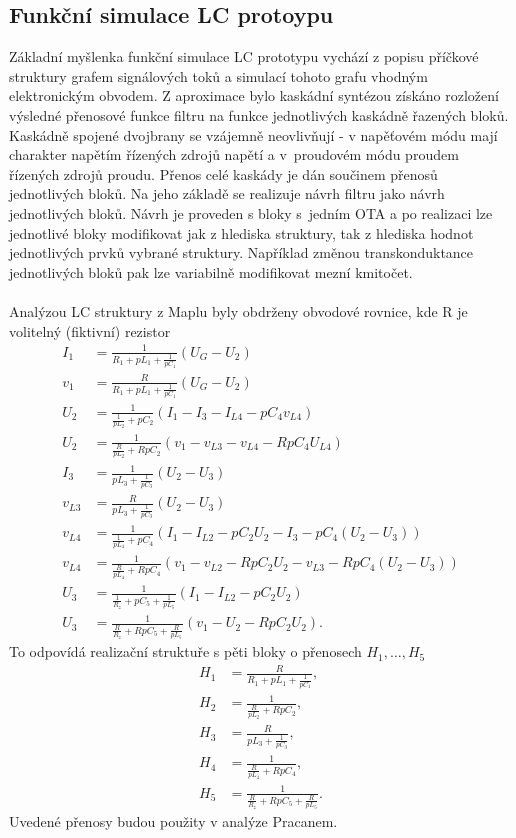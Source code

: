 \subsection{Funkční simulace LC protoypu}\label{s:KASK}
Základní myšlenka funkční simulace LC prototypu vychází z popisu příčkové struktury grafem signálových toků a simulací tohoto grafu vhodným elektronickým obvodem. Z aproximace bylo kaskádní syntézou získáno rozložení výsledné přenosové funkce filtru na funkce jednotlivých kaskádně řazených bloků. Kaskádně spojené dvojbrany se vzájemně neovlivňují - v napěťovém módu mají charakter napětím řízených zdrojů napětí a v~proudovém módu proudem řízených zdrojů proudu. Přenos celé kaskády je dán součinem přenosů jednotlivých bloků. Na jeho základě se realizuje návrh filtru jako návrh jednotlivých bloků. Návrh je proveden s bloky s~jedním OTA a po realizaci lze jednotlivé bloky modifikovat jak z hlediska struktury, tak z hlediska hodnot jednotlivých prvků vybrané struktury. Například změnou transkonduktance jednotlivých bloků pak lze variabilně modifikovat mezní kmitočet.\\
\\
\noindent Analýzou LC struktury z Maplu byly obdrženy obvodové rovnice, kde R je volitelný (fiktivní) rezistor
\begin{align}
I_1 &= \frac{1}{R_1 + pL_1 + \frac{1}{pC_1}}(U_G - U_2)\\
v_1 & = \frac{R}{R_1 + pL_1 + \frac{1}{pC_1}}(U_G - U_2)\\
U_2 &= \frac{1}{\frac{1}{pL_2} + pC_2}(I_1 - I_{3} - I_{L4} - pC_4 v_{L4})\\
U_2 &= \frac{1}{\frac{R}{pL_2} + RpC_2}(v_1 - v_{L3} - v_{L4} - RpC_4 U_{L4})\\
I_{3} &= \frac{1}{pL_3 + \frac{1}{pC_3}}(U_2 - U_3)\\
v_{L3} &= \frac{R}{pL_3 + \frac{1}{pC_3}}(U_2 - U_3)\\
v_{L4} &= \frac{1}{\frac{1}{pL_4}+pC_4}(I_1 - I_{L2} - pC_2U_2 - I_{3} - pC_4 (U_2 - U_3))\\
v_{L4} &= \frac{1}{\frac{R}{pL_4}+RpC_4}(v_1 - v_{L2} - RpC_2U_2 - v_{L3} - RpC_4 (U_2 - U_3))\\
U_3 &= \frac{1}{\frac{1}{R_z}+pC_5 + \frac{1}{pL_5}}(I_1 - I_{L2} - pC_2U_2)\\
U_3 &= \frac{1}{\frac{R}{R_z}+RpC_5 + \frac{R}{pL_5}}(v_1 - U_2 - RpC_2 U_2).
\end{align}
\noindent To odpovídá realizační struktuře s pěti bloky o přenosech $H_1, \ldots,H_5$
\begin{align}
H_1 & = \frac{R}{R_1 + pL_1 + \frac{1}{pC_1}},\\
H_2 &= \frac{1}{\frac{R}{pL_2} + RpC_2},\\
H_3 &= \frac{R}{pL_3 + \frac{1}{pC_3}},\\
H_4 &= \frac{1}{\frac{R}{pL_4}+RpC_4},\\
H_5 &= \frac{1}{\frac{R}{R_z}+RpC_5 + \frac{R}{pL_5}}.
\end{align}
\noindent Uvedené přenosy budou použity v analýze Pracanem.
